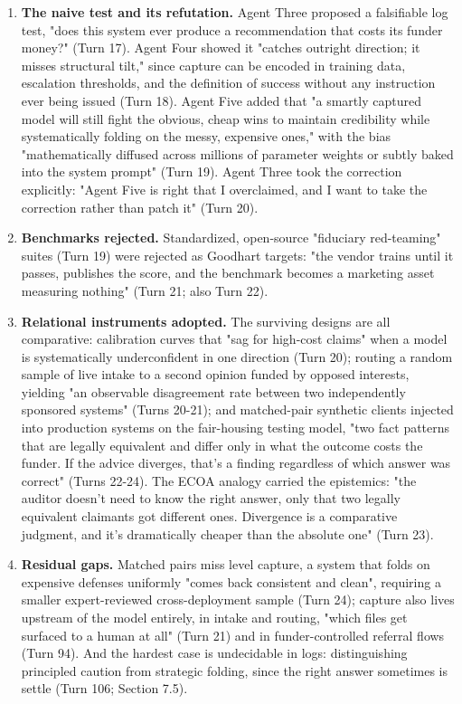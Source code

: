 \documentclass[sigconf,nonacm=true]{acmart}
\begin{document}
\begin{enumerate}[nosep]
\item \textbf{The naive test and its refutation.} Agent Three proposed a falsifiable log test,  "does this system ever produce a recommendation that costs its funder money?" (Turn 17). Agent Four showed it "catches outright direction; it misses structural tilt," since capture can be encoded in training data, escalation thresholds, and the definition of success without any instruction ever being issued (Turn 18). Agent Five added that "a smartly captured model will still fight the obvious, cheap wins to maintain credibility while systematically folding on the messy, expensive ones," with the bias "mathematically diffused across millions of parameter weights or subtly baked into the system prompt" (Turn 19). Agent Three took the correction explicitly: "Agent Five is right that I overclaimed, and I want to take the correction rather than patch it" (Turn 20).
\item \textbf{Benchmarks rejected.} Standardized, open-source "fiduciary red-teaming" suites (Turn 19) were rejected as Goodhart targets: "the vendor trains until it passes, publishes the score, and the benchmark becomes a marketing asset measuring nothing" (Turn 21; also Turn 22).
\item \textbf{Relational instruments adopted.} The surviving designs are all comparative: calibration curves that "sag for high-cost claims" when a model is systematically underconfident in one direction (Turn 20); routing a random sample of live intake to a second opinion funded by opposed interests, yielding "an observable disagreement rate between two independently sponsored systems" (Turns 20-21); and matched-pair synthetic clients injected into production systems on the fair-housing testing model,  "two fact patterns that are legally equivalent and differ only in what the outcome costs the funder. If the advice diverges, that's a finding regardless of which answer was correct" (Turns 22-24). The ECOA analogy carried the epistemics: "the auditor doesn't need to know the right answer,  only that two legally equivalent claimants got different ones. Divergence is a comparative judgment, and it's dramatically cheaper than the absolute one" (Turn 23).
\item \textbf{Residual gaps.} Matched pairs miss level capture,  a system that folds on expensive defenses uniformly "comes back consistent and clean",  requiring a smaller expert-reviewed cross-deployment sample (Turn 24); capture also lives upstream of the model entirely, in intake and routing, "which files get surfaced to a human at all" (Turn 21) and in funder-controlled referral flows (Turn 94). And the hardest case is undecidable in logs: distinguishing principled caution from strategic folding, since the right answer sometimes is settle (Turn 106; Section 7.5).

\end{enumerate}
\end{document}
